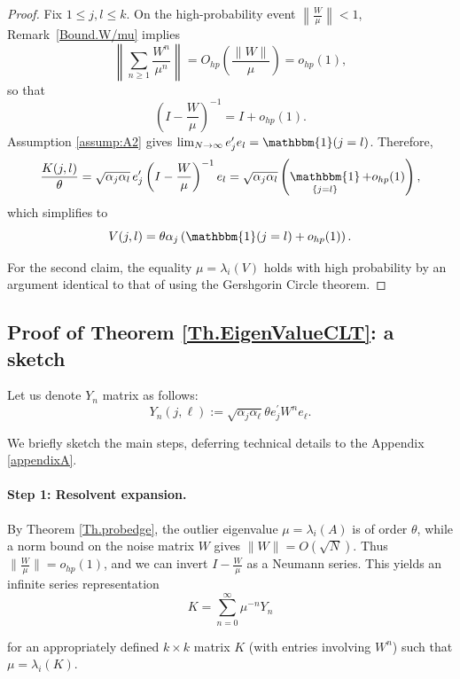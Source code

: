 \documentclass[11pt, reqno]{amsart}
\DeclareMathOperator{\one}{\mathbbm{1}} %
\numberwithin{equation}{section}
\begin{document}
\begin{proof}
Fix \( 1 \le j, l \le k \). On the high-probability event \( \left\| \frac{W}{\mu} \right\| < 1 \), Remark~\ref{Bound.W/mu} implies
\[
\left\| \sum_{n \ge 1} \frac{W^n}{\mu^n} \right\| = O_{hp}\left( \frac{\|W\|}{\mu} \right) = o_{hp}(1),
\]
so that
\[
\left( I - \frac{W}{\mu} \right)^{-1} = I + o_{hp}(1).
\]
Assumption \eqref{assump:A2} gives \( \lim_{N \to \infty} e_j^\prime e_l = \one(j = l) \). Therefore,
\[
\frac{K(j, l)}{\theta} = \sqrt{\alpha_j \alpha_l} \, e_j^\prime \left(I - \frac{W}{\mu}\right)^{-1} e_l = \sqrt{\alpha_j \alpha_l} \left( \one_{\{j = l\}} + o_{hp}(1) \right),
\]
which simplifies to
\[
V(j, l) = \theta \alpha_j \left( \one(j = l) + o_{hp}(1) \right).
\]

For the second claim, the equality \( \mu = \lambda_i(V) \) holds with high probability by an argument identical to that of \cite[Lemma 5.2]{chakrabarty2020eigenvalues} using the Gershgorin Circle theorem. 
\end{proof}

\subsection{Proof of Theorem \ref{Th.EigenValueCLT}: a sketch}
Let us denote $Y_n$ matrix as follows:
\begin{equation}\label{eq:Y}
 Y_n(j, \ell):=\sqrt{\alpha_j \alpha_{\ell}} \theta e_j^{\prime} W^n e_{\ell}.
\end{equation}

We briefly sketch the main steps, deferring technical details to the Appendix \ref{appendixA}.


\paragraph{{\bf Step 1:   Resolvent expansion.}} By Theorem \ref{Th.probedge}, the outlier eigenvalue $\mu=\lambda_i(A)$ is of order $\theta$, while a norm bound on the noise matrix $W$ gives $\|W\| = O(\sqrt{N})$. Thus $\big\|\frac{W}{\mu}\big\| = o_{hp}(1)$, and we can invert $I - \frac{W}{\mu}$ as a Neumann series. This yields an infinite series representation
   \begin{equation}\label{K:inf}
   K=\sum_{n=0}^{\infty} \mu^{-n} Y_n
   \end{equation}

    for an appropriately defined $k\times k$ matrix $K$ (with entries involving $W^n$) such that $\mu = \lambda_i(K)$.
\end{document}
